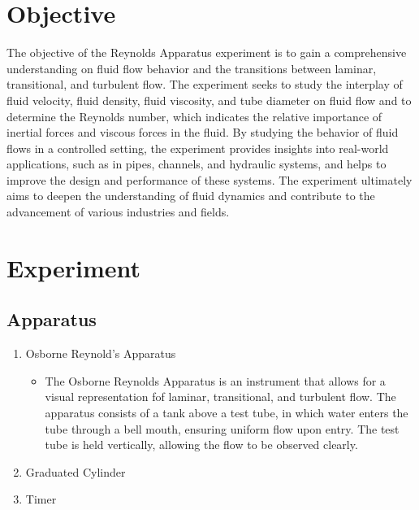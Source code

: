 \documentclass{article}
\begin{document}

\newpage
\doublespacing
\tableofcontents
\newpage
{}
\listoftables
{}
\listoffigures
\newpage
\section{Objective} 
\par The objective of the Reynolds Apparatus experiment is to gain a comprehensive understanding on fluid flow behavior and the transitions between laminar, transitional, and turbulent flow. The experiment seeks to study the interplay of fluid velocity, fluid density, fluid viscosity, and tube diameter on fluid flow and to determine the Reynolds number, which indicates the relative importance of inertial forces and viscous forces in the fluid. By studying the behavior of fluid flows in a controlled setting, the experiment provides insights into real-world applications, such as in pipes, channels, and hydraulic systems, and helps to improve the design and performance of these systems. The experiment ultimately aims to deepen the understanding of fluid dynamics and contribute to the advancement of various industries and fields. 
\newpage
\section{Experiment}
\subsection{Apparatus}
\begin{enumerate}
    \item Osborne Reynold's Apparatus
    \begin{itemize}
        \item The Osborne Reynolds Apparatus is an instrument that allows for a visual representation fof laminar, transitional, and turbulent flow. The apparatus consists of a tank above a test tube, in which water enters the tube through a bell mouth, ensuring uniform flow upon entry. The test tube is held vertically, allowing the flow to be observed clearly.
    \end{itemize}
    \item Graduated Cylinder 
    \item Timer
\end{enumerate}
\end{document}
